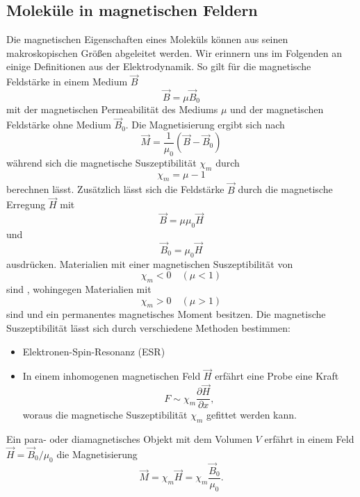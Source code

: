 \subsection{Moleküle in magnetischen Feldern}
	Die magnetischen Eigenschaften eines Moleküls können aus seinen makroskopischen Größen abgeleitet werden. Wir erinnern uns im Folgenden an einige Definitionen aus der Elektrodynamik. So gilt für die magnetische Feldstärke in einem Medium $ \vec{B}$
	\begin{equation}
		\label{eq:2.26}	
		\vec{B} = \mu \vec{B}_{0}
	\end{equation}
	mit der magnetischen Permeabilität des Mediums $ \mu$ und der magnetischen Feldstärke ohne Medium $ \vec{B}_{0}$. 
	Die Magnetisierung ergibt sich nach
	\begin{equation}
		\label{eq:2.27}
		\vec{M} = \frac{1}{ \mu_0} \left( \vec{B} - \vec{B}_{0} \right) 
	\end{equation}
	während sich die magnetische Suszeptibilität $ \chi_{m}$ durch
	\begin{equation}
		\chi_{m} = \mu-1
	\end{equation}
	berechnen lässt. Zusätzlich lässt sich die Feldstärke $\vec B$ durch die magnetische Erregung $\vec H$ mit
	\begin{equation}
		\label{eq:2.29}
		\vec{B} = \mu \mu_0 \vec{H}
	\end{equation} 
	und 
	\begin{equation}
		\label{eq:2.30}
		\vec B_0 = \mu_0\vec H		
	\end{equation}
	ausdrücken. Materialien mit einer magnetischen Suszeptibilität von
	$$
	\chi_{m} <0 \quad \left( \mu <1 \right) 
	$$ 
	sind , wohingegen Materialien mit
	$$
	\chi_{m}>0 \quad \left( \mu > 1 \right) 
	$$ 
	 sind und ein permanentes magnetisches Moment besitzen. Die magnetische Suszeptibilität lässt sich durch verschiedene Methoden bestimmen:
	\begin{itemize}
		\item Elektronen-Spin-Resonanz (ESR)
		\item In einem inhomogenen magnetischen Feld $\vec H$ erfährt eine Probe eine Kraft
			$$
			F \sim \chi_{m} \frac{\partial \vec{H} }{\partial x},	
			$$ 
			woraus die magnetische Suszeptibilität $\chi_m$ gefittet werden kann.
	\end{itemize}

	Ein para- oder diamagnetisches Objekt mit dem Volumen $V$ erfährt in einem Feld $\vec{H} = \vec B_0/ \mu_0$ die Magnetisierung
	\begin{equation}
		\label{eq:2.31}
		\vec{M} = \chi_{m} \vec{H} = \chi_{m} \frac{\vec B_0}{ \mu_0}.
	\end{equation}

